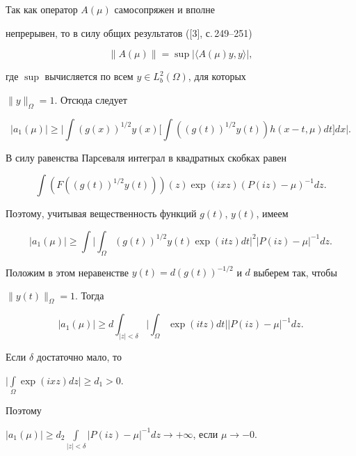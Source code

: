 \begin{pf}


Так как оператор $A(\mu)$ самосопряжен и вполне


непрерывен, то в силу общих результатов ([3], с.\,249--251)


$$


\|A(\mu)\|=\sup|\langle A(\mu)y,y\rangle|,


$$


где $\sup$ вычисляется по всем $y\in L^2_b(\Omega)$, для которых


$\|y\|_\Omega=1$. Отсюда следует


$$


|a_1(\mu)|\ge\bigg|\int(g(x))^{1/2}y(x)\bigg[


\int((g(t))^{1/2}y(t))h(x-t,\mu)dt\bigg] dx\bigg|.


$$


В силу равенства Парсеваля интеграл в квадратных скобках равен


$$


\int(F((g(t))^{1/2}y(t)))(z)\exp(ixz)(P(iz)-\mu)^{-1}dz.


$$


Поэтому, учитывая вещественность функций $g(t)$, $y(t)$, имеем


$$


|a_1(\mu)|\ge\int\bigg|\int_\Omega(g(t))^{1/2}y(t)


\exp(itz)dt\bigg|^2|P(iz)-\mu|^{-1}dz.


$$


Положим в этом неравенстве $y(t)=d(g(t))^{-1/2}$ и $d$ выберем так, чтобы


$\|y(t)\|_\Omega=1$. Тогда


$$


|a_1(\mu)|\ge d\int_{|z|<\delta}\bigg|\int_\Omega


\exp(itz)dt\bigg| |P(iz)-\mu|^{-1}dz.


$$


Если $\delta$ достаточно мало, то


$\Big|\int\limits_{\Omega} \exp (ixz) dz\Big|\ge d_1>0$.


Поэтому


$|a_{1}(\mu)|\ge d_2\int\limits_{|z|<\delta}|P(iz)-\mu|^{-1}


dz\to+\infty$, если $\mu \to-0$.


\end{pf}





